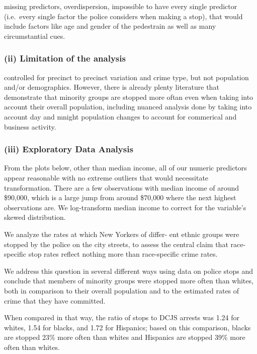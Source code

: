 \documentclass[]{article}
\begin{document}
missing predictors, overdispersion, impossible to have every single
predictor (i.e.~every single factor the police considers when making a
stop), that would include factors like age and gender of the pedestrain
as well as many circumstantial cues.

\hypertarget{ii-limitation-of-the-analysis}{%
\subsubsection{(ii) Limitation of the
analysis}\label{ii-limitation-of-the-analysis}}

controlled for precinct to precinct variation and crime type, but not
population and/or demographics. However, there is already plenty
literature that demonstrate that minority groups are stopped more oftan
even when taking into account their overall population, including
nuanced analysis done by taking into account day and mnight population
changes to account for commerical and business activity.

\hypertarget{iii-exploratory-data-analysis}{%
\subsubsection{(iii) Exploratory Data
Analysis}\label{iii-exploratory-data-analysis}}

From the plots below, other than median income, all of our numeric
predictors appear reasonable with no extreme outliers that would
necessitate transformation. There are a few observations with median
income of around \$90,000, which is a large jump from around \$70,000
where the next highest observations are. We log-transform median income
to correct for the variable's skewed distribution.

We analyze the rates at which New Yorkers of differ- ent ethnic groups
were stopped by the police on the city streets, to assess the central
claim that race-specific stop rates reflect nothing more than
race-specific crime rates.

We address this question in several different ways using data on police
stops and conclude that members of minority groups were stopped more
often than whites, both in comparison to their overall population and to
the estimated rates of crime that they have committed.

When compared in that way, the ratio of stops to DCJS arrests was 1.24
for whites, 1.54 for blacks, and 1.72 for Hispanics; based on this
comparison, blacks are stopped 23\% more often than whites and Hispanics
are stopped 39\% more often than whites.
\end{document}
